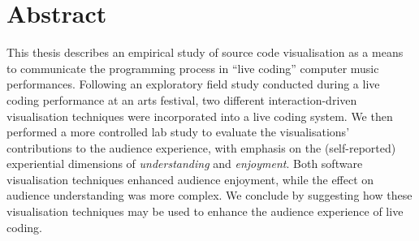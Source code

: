
\chapter*{Abstract}
\label{cha:abstract}

This thesis describes an empirical study of source code visualisation
as a means to communicate the programming process in ``live coding''
computer music performances. Following an exploratory field study
conducted during a live coding performance at an arts festival, two
different interaction-driven visualisation techniques were
incorporated into a live coding system. We then performed a more
controlled lab study to evaluate the visualisations' contributions
to the audience experience, with emphasis on the (self-reported)
experiential dimensions of \emph{understanding} and
\emph{enjoyment}. Both software visualisation techniques enhanced
audience enjoyment, while the effect on audience understanding was
more complex. We conclude by suggesting how these visualisation
techniques may be used to enhance the audience experience of live
coding.






